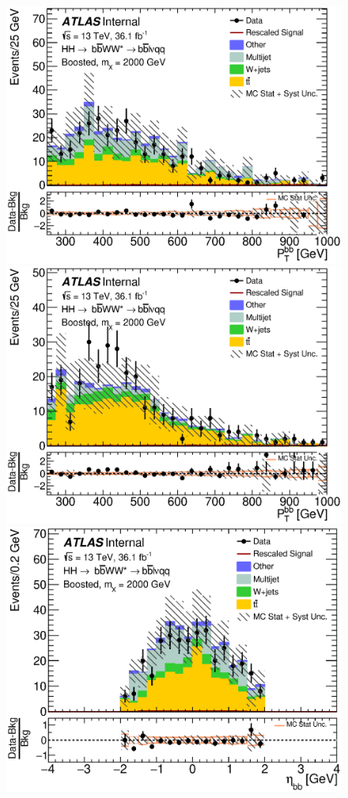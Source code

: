 \begin{figure}[h]
\begin{center}
\includegraphics[scale=0.33]{figures/kinplots/new/C_2tag_mbbcr_elec_presel_met50_HbbPt}
\includegraphics[scale=0.33]{figures/kinplots/new/C_2tag_mbbcr_muon_presel_met50_HbbPt}\\
\includegraphics[scale=0.33]{figures/kinplots/new/C_2tag_mbbcr_elec_presel_met50_HbbEta}

\end{center}
\end{figure}

